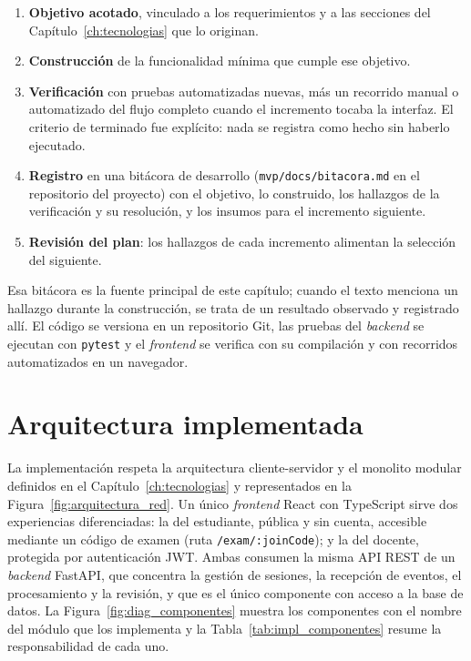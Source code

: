 \begin{enumerate}
    \item \textbf{Objetivo acotado}, vinculado a los requerimientos y a las secciones del Capítulo~\ref{ch:tecnologias} que lo originan.
    \item \textbf{Construcción} de la funcionalidad mínima que cumple ese objetivo.
    \item \textbf{Verificación} con pruebas automatizadas nuevas, más un recorrido manual o automatizado del flujo completo cuando el incremento tocaba la interfaz. El criterio de terminado fue explícito: nada se registra como hecho sin haberlo ejecutado.
    \item \textbf{Registro} en una bitácora de desarrollo (\texttt{mvp/docs/bitacora.md} en el repositorio del proyecto) con el objetivo, lo construido, los hallazgos de la verificación y su resolución, y los insumos para el incremento siguiente.
    \item \textbf{Revisión del plan}: los hallazgos de cada incremento alimentan la selección del siguiente.
\end{enumerate}

Esa bitácora es la fuente principal de este capítulo; cuando el texto menciona un hallazgo durante la construcción, se trata de un resultado observado y registrado allí. El código se versiona en un repositorio Git, las pruebas del \textit{backend} se ejecutan con \texttt{pytest} y el \textit{frontend} se verifica con su compilación y con recorridos automatizados en un navegador.

\section{Arquitectura implementada}
\label{sec:impl_arquitectura}

La implementación respeta la arquitectura cliente-servidor y el monolito modular definidos en el Capítulo~\ref{ch:tecnologias} y representados en la Figura~\ref{fig:arquitectura_red}. Un único \textit{frontend} React con TypeScript sirve dos experiencias diferenciadas: la del estudiante, pública y sin cuenta, accesible mediante un código de examen (ruta \texttt{/exam/:joinCode}); y la del docente, protegida por autenticación JWT. Ambas consumen la misma API REST de un \textit{backend} FastAPI, que concentra la gestión de sesiones, la recepción de eventos, el procesamiento y la revisión, y que es el único componente con acceso a la base de datos. La Figura~\ref{fig:diag_componentes} muestra los componentes con el nombre del módulo que los implementa y la Tabla~\ref{tab:impl_componentes} resume la responsabilidad de cada uno.


